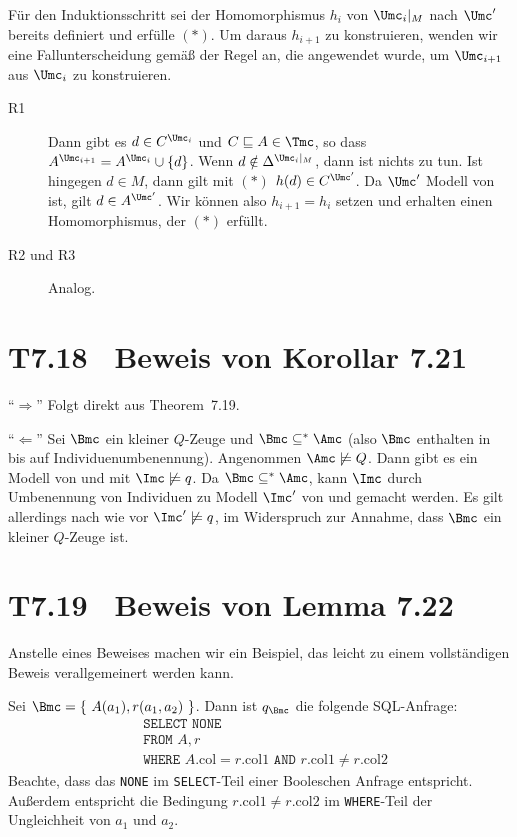 \documentclass[fontsize=11pt, twoside=false, numbers=autoenddot]{scrbook}
\begin{document}
Für den Induktionsschritt sei der Homomorphismus $h_i$ von $\Umc_i|_M$ nach $\Umc'$
bereits definiert und erfülle $(*)$.
Um daraus $h_{i+1}$ zu konstruieren, wenden wir eine Fallunterscheidung gemäß
der Regel an, die angewendet wurde, um $\Umc_{i+1}$ aus $\Umc_i$ zu
konstruieren.
%
\begin{description}
  \item[\textsf{R1}]
    Dann gibt es $d \in C^{\Umc_i}$ und $C \sqsubseteq A \in \Tmc$,
    so dass $A^{\Umc_{i+1}} = A^{\Umc_i} \cup \{d\}$.
    Wenn $d \notin \Delta^{\Umc_i|_M}$, dann ist nichts zu tun.
    Ist hingegen $d \in M$, dann gilt mit $(*)$ $h(d) \in C^{\Umc'}$.
    Da $\Umc'$ Modell von \Tmc ist, gilt $d \in A^{\Umc'}$.
    Wir können also $h_{i+1} = h_i$ setzen
    und erhalten einen Homomorphismus, der $(*)$ erfüllt.
  \item[\textsf{R2} und \textsf{R3}]
    Analog.
    \qedhere
\end{description}


\section*{T7.18~ Beweis von Korollar 7.21}

``$\Rightarrow$'' Folgt direkt aus Theorem~7.19.

\smallskip

``$\Leftarrow$'' Sei $\Bmc$ ein kleiner $Q$-Zeuge und $\Bmc\subseteq^*
\Amc$ (also $\Bmc$ enthalten in \Amc bis auf Individuenumbenennung).
Angenommen $\Amc\not\models Q$. Dann gibt es ein Modell \Imc von \Amc
und \Tmc mit $\Imc\not\models q$. Da $\Bmc\subseteq^*\Amc$, kann
$\Imc$ durch Umbenennung von Individuen zu Modell $\Imc'$ von \Bmc und
\Tmc gemacht werden. Es gilt allerdings nach wie vor $\Imc'\not\models
q$, im Widerspruch zur Annahme, dass $\Bmc$ ein kleiner $Q$-Zeuge ist. 


\pagebreak
\section*{T7.19~ Beweis von Lemma 7.22}

Anstelle eines Beweises machen wir ein Beispiel, das leicht zu einem
vollständigen Beweis verallgemeinert werden kann.

Sei $\Bmc=\{\ A(a_1), r(a_1,a_2)\ \}$. Dann ist $q_\Bmc$ die folgende
SQL-Anfrage: 
%
\begin{align*}
  & \texttt{SELECT NONE} \\
  & \texttt{FROM } A,r \\
  & \texttt{WHERE } A.\text{col} = r.\text{col1} \texttt{ AND }
  r.\text{col1} \neq r.\text{col2}
\end{align*}
%
Beachte, dass das \texttt{NONE} im \texttt{SELECT}-Teil einer Booleschen 
Anfrage entspricht. Außerdem entspricht die Bedingung $r.\text{col1} \neq
r.\text{col2}$ im \texttt{WHERE}-Teil der Ungleichheit von $a_1$ und
$a_2$.
  
\end{document}
